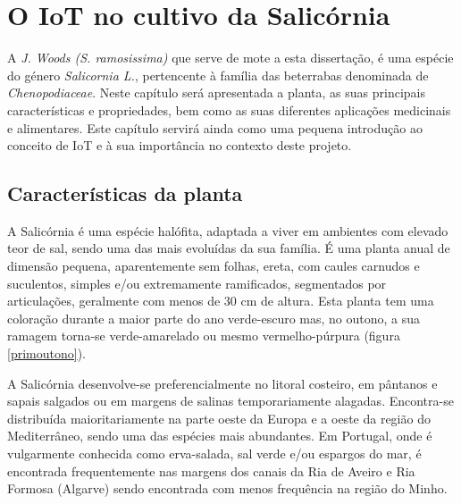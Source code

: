 
\chapter{O \acl{IoT} no cultivo da Salicórnia}

 A \sr \space \textit{J. Woods (S. ramosissima)}\cite{JoaoSilva} que serve de mote a esta dissertação, é uma espécie do género \textit{Salicornia L.}, pertencente à família das beterrabas denominada de \textit{Chenopodiaceae}\cite{chenopodiaceae}.  Neste capítulo será apresentada a planta, as suas principais características e propriedades, bem como as suas diferentes aplicações medicinais e alimentares. Este capítulo servirá ainda como uma pequena introdução ao conceito de \ac{IoT} e à sua  importância no contexto deste projeto.


\section{Características da planta}


A Salicórnia é uma espécie halófita, adaptada a viver em ambientes com elevado teor de sal\cite{ferri}, sendo uma das mais evoluídas da sua família. É uma planta anual de dimensão pequena, aparentemente sem folhas, ereta, com caules carnudos e suculentos, simples e/ou extremamente ramificados, segmentados por articulações\cite{Silva2000}, geralmente com menos de 30 cm de altura\cite{overviewsal}. Esta planta tem uma coloração durante a maior parte do ano verde-escuro mas, no outono, a sua ramagem torna-se verde-amarelado ou mesmo vermelho-púrpura (figura \ref{primoutono})\cite{Silva2000}.

A Salicórnia desenvolve-se preferencialmente no litoral costeiro, em pântanos e sapais salgados ou em margens de salinas temporariamente alagadas. Encontra-se distribuída maioritariamente na parte oeste da Europa e a oeste da região do Mediterrâneo, sendo uma das espécies mais abundantes\cite{Figueroa1987}. Em Portugal, onde é vulgarmente conhecida como erva-salada, sal verde e/ou espargos do mar\cite{RaquelPinto}, é encontrada frequentemente nas margens dos canais da Ria de Aveiro e Ria Formosa (Algarve)\cite{RaquelPinto} sendo encontrada com menos frequência na região do Minho\cite{Silva2000}. 

\newpage

